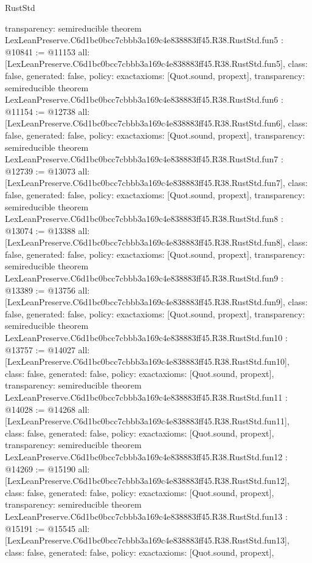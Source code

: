 \begin{lexlean}{RustStd}
\begin{coremodule}
{  transparency: semireducible
}
theorem LexLeanPreserve.C6d1bc0bcc7cbbb3a169c4e838883ff45.R38.RustStd.fun5 : @10841 := @11153 {
  all: [LexLeanPreserve.C6d1bc0bcc7cbbb3a169c4e838883ff45.R38.RustStd.fun5],
  class: false,
  generated: false,
  policy: exact{axioms: [Quot.sound, propext]},
  transparency: semireducible
}
theorem LexLeanPreserve.C6d1bc0bcc7cbbb3a169c4e838883ff45.R38.RustStd.fun6 : @11154 := @12738 {
  all: [LexLeanPreserve.C6d1bc0bcc7cbbb3a169c4e838883ff45.R38.RustStd.fun6],
  class: false,
  generated: false,
  policy: exact{axioms: [Quot.sound, propext]},
  transparency: semireducible
}
theorem LexLeanPreserve.C6d1bc0bcc7cbbb3a169c4e838883ff45.R38.RustStd.fun7 : @12739 := @13073 {
  all: [LexLeanPreserve.C6d1bc0bcc7cbbb3a169c4e838883ff45.R38.RustStd.fun7],
  class: false,
  generated: false,
  policy: exact{axioms: [Quot.sound, propext]},
  transparency: semireducible
}
theorem LexLeanPreserve.C6d1bc0bcc7cbbb3a169c4e838883ff45.R38.RustStd.fun8 : @13074 := @13388 {
  all: [LexLeanPreserve.C6d1bc0bcc7cbbb3a169c4e838883ff45.R38.RustStd.fun8],
  class: false,
  generated: false,
  policy: exact{axioms: [Quot.sound, propext]},
  transparency: semireducible
}
theorem LexLeanPreserve.C6d1bc0bcc7cbbb3a169c4e838883ff45.R38.RustStd.fun9 : @13389 := @13756 {
  all: [LexLeanPreserve.C6d1bc0bcc7cbbb3a169c4e838883ff45.R38.RustStd.fun9],
  class: false,
  generated: false,
  policy: exact{axioms: [Quot.sound, propext]},
  transparency: semireducible
}
theorem LexLeanPreserve.C6d1bc0bcc7cbbb3a169c4e838883ff45.R38.RustStd.fun10 : @13757 := @14027 {
  all: [LexLeanPreserve.C6d1bc0bcc7cbbb3a169c4e838883ff45.R38.RustStd.fun10],
  class: false,
  generated: false,
  policy: exact{axioms: [Quot.sound, propext]},
  transparency: semireducible
}
theorem LexLeanPreserve.C6d1bc0bcc7cbbb3a169c4e838883ff45.R38.RustStd.fun11 : @14028 := @14268 {
  all: [LexLeanPreserve.C6d1bc0bcc7cbbb3a169c4e838883ff45.R38.RustStd.fun11],
  class: false,
  generated: false,
  policy: exact{axioms: [Quot.sound, propext]},
  transparency: semireducible
}
theorem LexLeanPreserve.C6d1bc0bcc7cbbb3a169c4e838883ff45.R38.RustStd.fun12 : @14269 := @15190 {
  all: [LexLeanPreserve.C6d1bc0bcc7cbbb3a169c4e838883ff45.R38.RustStd.fun12],
  class: false,
  generated: false,
  policy: exact{axioms: [Quot.sound, propext]},
  transparency: semireducible
}
theorem LexLeanPreserve.C6d1bc0bcc7cbbb3a169c4e838883ff45.R38.RustStd.fun13 : @15191 := @15545 {
  all: [LexLeanPreserve.C6d1bc0bcc7cbbb3a169c4e838883ff45.R38.RustStd.fun13],
  class: false,
  generated: false,
  policy: exact{axioms: [Quot.sound, propext]},
}
\end{coremodule}
\end{lexlean}
